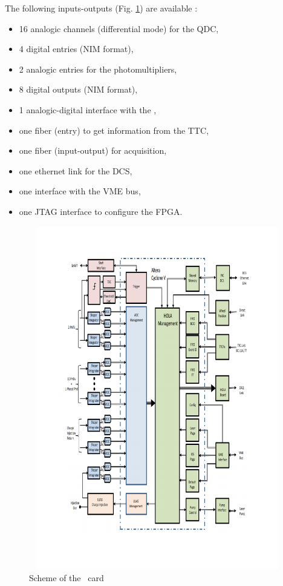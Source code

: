 The following inputs-outputs (Fig. \ref{fig:laslascarlinks}) are available :
\begin{itemize}
\item 16 analogic channels (differential mode) for the QDC,
\item 4 digital entries (NIM format),
\item 2 analogic entries for the photomultipliers,
\item 8 digital outputs (NIM format),
\item 1 analogic-digital interface with the \las,
\item one fiber (entry) to get information from the TTC,
\item one fiber (input-output) for acquisition,
\item one ethernet link for the DCS,
\item one interface with the VME bus,
\item one JTAG interface to configure the FPGA.

\end{itemize}

\begin{figure}[htbp]

\centering
\includegraphics[height=15cm,width=15cm]{figures/Lascarlinks.pdf}
\caption{Scheme of the \lascar~card}\label{fig:laslascarlinks}
\end{figure}


